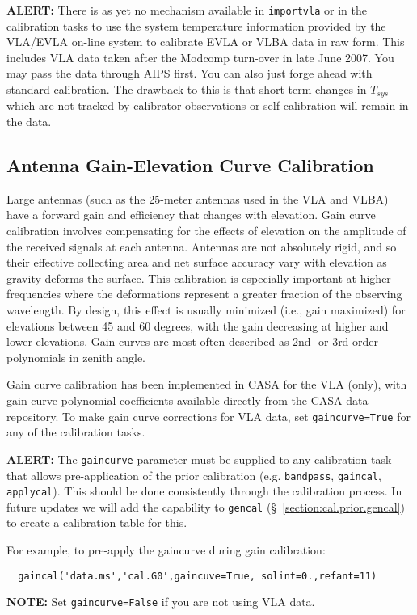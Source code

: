 {\bf ALERT:} There is as yet no mechanism available in {\tt importvla}
or in the calibration tasks to use the system temperature information
provided by the VLA/EVLA on-line system to calibrate EVLA or VLBA data
in raw form.  This includes VLA data taken after the Modcomp turn-over
in late June 2007.  You may pass the data through AIPS first.  You can
also just forge ahead with standard calibration.  The drawback to this
is that short-term changes in $T_{sys}$ which are not tracked by
calibrator observations or self-calibration will remain in the data.

\subsection{Antenna Gain-Elevation Curve Calibration}
\label{section:cal.prior.curves}

Large antennas (such as the 25-meter antennas used
in the VLA and VLBA) have a forward gain and efficiency that changes with
elevation. Gain curve calibration involves compensating for the effects of
elevation on the amplitude of the received signals at each antenna.
Antennas are not absolutely rigid, and so their effective collecting
area and net surface accuracy vary with elevation as gravity deforms
the surface.  This calibration is especially important at higher
frequencies where the deformations represent a greater fraction of the
observing wavelength.  By design, this effect is usually minimized
(i.e., gain maximized) for elevations between 45 and 60 degrees, with
the gain decreasing at higher and lower elevations.  Gain curves are
most often described as 2nd- or 3rd-order polynomials in zenith angle.

Gain curve calibration has been implemented in CASA
for the VLA (only), with gain curve polynomial coefficients available
directly from the CASA data repository.  To make gain curve
corrections for VLA data, set {\tt gaincurve=True}
for any of the calibration tasks.

{\bf ALERT:} The {\tt gaincurve} parameter must be supplied
to any calibration task that allows pre-application of the prior
calibration (e.g. {\tt bandpass}, {\tt gaincal}, {\tt applycal}).
This should be done consistently through the calibration process.
In future updates we will add the capability to {\tt gencal}
(\S~\ref{section:cal.prior.gencal}) to create a calibration table for this.

For example, to pre-apply the gaincurve during gain calibration:
\small
\begin{verbatim}
  gaincal('data.ms','cal.G0',gaincuve=True, solint=0.,refant=11)
\end{verbatim}
\normalsize
{\bf NOTE:} Set {\tt gaincurve=False} if you are not using VLA data.

